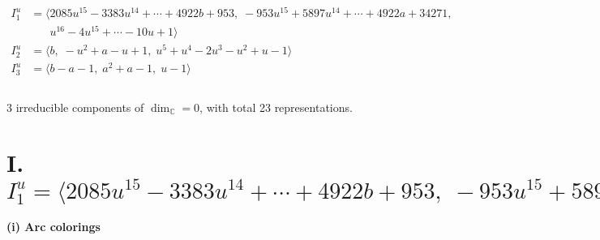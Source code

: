 \documentclass[1p]{elsarticle_modified}
\theoremstyle{definition}
\begin{document}
\begin{align*}
I^u_{1}&=\langle 
2085 u^{15}-3383 u^{14}+\cdots+4922 b+953,\;-953 u^{15}+5897 u^{14}+\cdots+4922 a+34271,\\
\phantom{I^u_{1}}&\phantom{= \langle  }u^{16}-4 u^{15}+\cdots-10 u+1\rangle \\
I^u_{2}&=\langle 
b,\;- u^2+a- u+1,\;u^5+u^4-2 u^3- u^2+u-1\rangle \\
I^u_{3}&=\langle 
b- a-1,\;a^2+a-1,\;u-1\rangle \\
\\
\end{align*}
\raggedright * 3 irreducible components of $\dim_{\mathbb{C}}=0$, with total 23 representations.\\
\newpage
\renewcommand{\arraystretch}{1}
\centering \section*{I. $I^u_{1}= \langle 2085 u^{15}-3383 u^{14}+\cdots+4922 b+953,\;-953 u^{15}+5897 u^{14}+\cdots+4922 a+34271,\;u^{16}-4 u^{15}+\cdots-10 u+1 \rangle$}
\flushleft \textbf{(i) Arc colorings}\\
\end{document}
